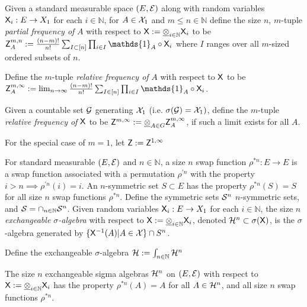 \begin{definition}\label{def:partial_freq}
Given a standard measurable space $(E,\mathcal{E})$ along with random variables $\mathsf{X}_i:E\to X_1$ for each $i\in \mathbb{N}$, for $A\in \mathcal{X}_1$ and $m\leq n\in \mathbb{N}$ define the size $n$, $m$-tuple \emph{partial frequency of} $A$ with respect to $\mathsf{X}:=\underline{\otimes}_{i\in\mathbb{N}}\mathsf{X}_i$ to be $\RV{Z}^{m,n}_A:=\frac{(n-m)!}{n!}\sum_{I\subset [n]} \prod_{i\in I} \mathds{1}_A\circ \RV{X}_i$ where $I$ ranges over all $m$-sized ordered subsets of $n$.

Define the $m$-tuple \emph{relative frequency of } $A$ with respect to $\mathsf{X}$ to be $\RV{Z}^{m,\infty}_A:= \lim_{n\to \infty}\frac{(n-m)!}{n!}\sum_{I\in [n]} \prod_{i\in I} \mathds{1}_A\circ \RV{X}_i$.

Given a countable set $\mathcal{G}$ generating $\mathcal{X}_1$ (i.e. $\sigma(\mathcal{G})=\mathcal{X}_1)$, define the $m$-tuple \emph{relative frequency of} $\mathsf{X}$ to be $\mathsf{Z}^{m,\infty}:=\underline{\otimes}_{A\in G} \mathsf{Z}^{m,\infty}_A$, if such a limit exists for all $A$.

For the special case of $m=1$, let $\mathsf{Z}:=\mathsf{Z}^{1,\infty}$
\end{definition}

\begin{definition}\label{def:exchange_sig_alb}
For standard measurable $(E,\mathcal{E})$ and $n\in \mathbb{N}$, a size $n$ swap function $\rho^{*n}:E\to E$ is a swap function associated with a permutation $\rho^{\prime n}$ with the property $i>n\implies \rho^{\prime n}(i)=i$. An $n$-symmetric set $S\subset E$ has the property $\rho^{*n}(S)=S$ for all size $n$ swap functions $\rho^{*n}$. Define the symmetric sets $\mathcal{S}^n$ $n$-symmetric sets, and $\mathcal{S}=\cap_{n\in\mathbb{N}} \mathcal{S}^n$. Given random variables $\mathsf{X}_i:E\to X_1$ for each $i\in\mathbb{N}$, the size $n$ \emph{exchangeable $\sigma$-algebra} with respect to $\mathsf{X}:=\underline{\otimes}_{i\in\mathbb{N}}\mathsf{X}_i$, denoted $\mathcal{H}^n\subset\sigma(\mathsf{X})$, is the $\sigma$-algebra generated by $\{\mathsf{X}^{-1}(A)|A\in\mathcal{X}\}\cap S^n$.

Define the exchangeable $\sigma$-algebra $\mathcal{H}:=\int_{n\in\mathbb{N}} \mathcal{H}^n$
\end{definition}

\begin{lemma}
The size $n$ exchangeable sigma algebras $\mathcal{H}^n$ on $(E,\mathcal{E})$ with respect to $\mathsf{X}:=\underline{\otimes}_{i\in\mathbb{N}}\mathsf{X}_i$ has the property $\rho^{*n}(A)=A$ for all $A\in \mathcal{H}^n$, and all size $n$ swap functions $\rho^{*n}$.
\end{lemma}

